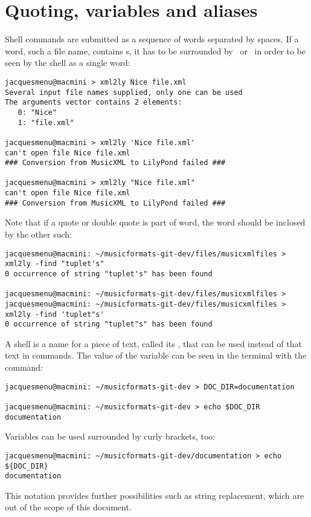 \section{Quoting, variables and aliases}\label{Quoting, variables and aliases}

Shell commands are submitted as a sequence of words separated by spaces. If a word, such a file name, contains s, it has to be surrounded by \quotes\ or \doubleQuotes\ in order to be seen by the shell as a single word:
\begin{lstlisting}[language=Terminal]
jacquesmenu@macmini > xml2ly Nice file.xml
Several input file names supplied, only one can be used
The arguments vector contains 2 elements:
   0: "Nice"
   1: "file.xml"

jacquesmenu@macmini > xml2ly 'Nice file.xml'
can't open file Nice file.xml
### Conversion from MusicXML to LilyPond failed ###

jacquesmenu@macmini > xml2ly "Nice file.xml"
can't open file Nice file.xml
### Conversion from MusicXML to LilyPond failed ###
\end{lstlisting}

Note that if a quote or double quote is part of word, the word should be inclosed by the other such:
\begin{lstlisting}[language=Terminal]
jacquesmenu@macmini: ~/musicformats-git-dev/files/musicxmlfiles > xml2ly -find "tuplet's"
0 occurrence of string "tuplet's" has been found

jacquesmenu@macmini: ~/musicformats-git-dev/files/musicxmlfiles > 
jacquesmenu@macmini: ~/musicformats-git-dev/files/musicxmlfiles > xml2ly -find 'tuplet"s'
0 occurrence of string "tuplet"s" has been found
\end{lstlisting}

A shell  is a name for a piece of text, called its , that can be used instead of that text in commands. The value of the variable can be seen in the terminal with the  command:
\begin{lstlisting}[language=Terminal]
jacquesmenu@macmini: ~/musicformats-git-dev > DOC_DIR=documentation

jacquesmenu@macmini: ~/musicformats-git-dev > echo $DOC_DIR
documentation
\end{lstlisting}

Variables can be used surrounded by curly brackets, too:
\begin{lstlisting}[language=Terminal]
jacquesmenu@macmini: ~/musicformats-git-dev/documentation > echo ${DOC_DIR}
documentation
\end{lstlisting}
This notation provides further possibilities such as string replacement, which are out of the scope of this document.

